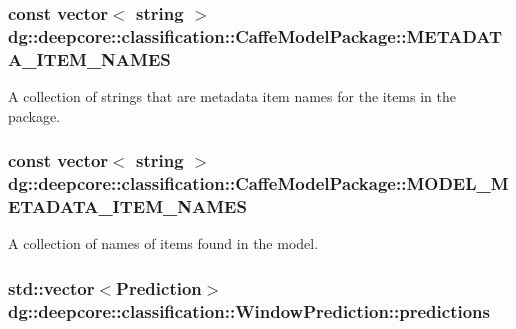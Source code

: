 \subsubsection[{\texorpdfstring{M\+E\+T\+A\+D\+A\+T\+A\+\_\+\+I\+T\+E\+M\+\_\+\+N\+A\+M\+ES}{METADATA_ITEM_NAMES}}]{\setlength{\rightskip}{0pt plus 5cm}const vector$<$ string $>$ dg\+::deepcore\+::classification\+::\+Caffe\+Model\+Package\+::\+M\+E\+T\+A\+D\+A\+T\+A\+\_\+\+I\+T\+E\+M\+\_\+\+N\+A\+M\+ES\hspace{0.3cm}{\ttfamily [static]}}\hypertarget{group___classification_module_ga0d8174bf9f1ba89932caa3abb73aa4cb}{}\label{group___classification_module_ga0d8174bf9f1ba89932caa3abb73aa4cb}


A collection of strings that are metadata item names for the items in the package. 

\subsubsection[{\texorpdfstring{M\+O\+D\+E\+L\+\_\+\+M\+E\+T\+A\+D\+A\+T\+A\+\_\+\+I\+T\+E\+M\+\_\+\+N\+A\+M\+ES}{MODEL_METADATA_ITEM_NAMES}}]{\setlength{\rightskip}{0pt plus 5cm}const vector$<$ string $>$ dg\+::deepcore\+::classification\+::\+Caffe\+Model\+Package\+::\+M\+O\+D\+E\+L\+\_\+\+M\+E\+T\+A\+D\+A\+T\+A\+\_\+\+I\+T\+E\+M\+\_\+\+N\+A\+M\+ES\hspace{0.3cm}{\ttfamily [static]}}\hypertarget{group___classification_module_ga66d66cfd2c51d9d01f001fc6d55afcaf}{}\label{group___classification_module_ga66d66cfd2c51d9d01f001fc6d55afcaf}


A collection of names of items found in the model. 

\subsubsection[{\texorpdfstring{predictions}{predictions}}]{\setlength{\rightskip}{0pt plus 5cm}std\+::vector$<$Prediction$>$ dg\+::deepcore\+::classification\+::\+Window\+Prediction\+::predictions}\hypertarget{group___classification_module_gaaec179dc0e22d9c897260b650c2a6b82}{}\label{group___classification_module_gaaec179dc0e22d9c897260b650c2a6b82}


